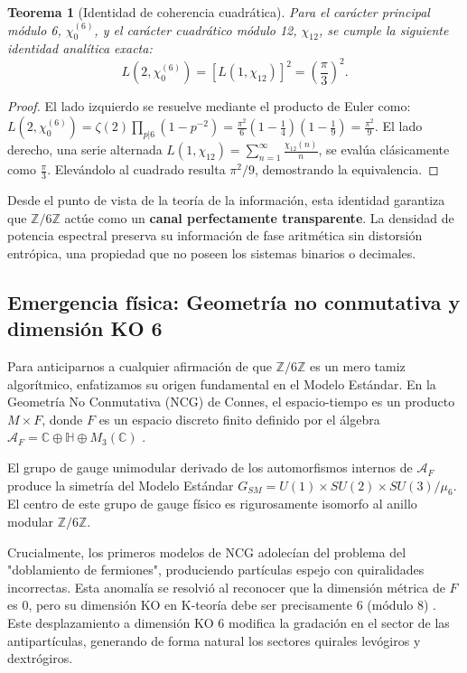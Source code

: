 \documentclass[aps,prl,preprint,superscriptaddress,floatfix]{revtex4-2}
\newtheorem{theorem}{Teorema}[section]
\newcommand{\Zmod}{\mathbb{Z}/6\mathbb{Z}}
\begin{document}
\begin{theorem}[Identidad de coherencia cuadrática]
\label{thm:quadratic}
Para el carácter principal módulo 6, $\chi_0^{(6)}$, y el carácter cuadrático módulo 12, $\chi_{12}$, se cumple la siguiente identidad analítica exacta:
\begin{equation}
L(2, \chi_0^{(6)}) = \left[ L(1, \chi_{12}) \right]^2 = \left( \frac{\pi}{3} \right)^2.
\end{equation}
\end{theorem}

\begin{proof}
El lado izquierdo se resuelve mediante el producto de Euler como:
$L(2, \chi_0^{(6)}) = \zeta(2) \prod_{p|6} (1-p^{-2}) = \frac{\pi^2}{6} \left(1-\frac{1}{4}\right)\left(1-\frac{1}{9}\right) = \frac{\pi^2}{9}$.
El lado derecho, una serie alternada $L(1, \chi_{12}) = \sum_{n=1}^\infty \frac{\chi_{12}(n)}{n}$, se evalúa clásicamente como $\frac{\pi}{3}$. Elevándolo al cuadrado resulta $\pi^2/9$, demostrando la equivalencia.
\end{proof}

Desde el punto de vista de la teoría de la información, esta identidad garantiza que $\Zmod$ actúe como un \textbf{canal perfectamente transparente}. La densidad de potencia espectral preserva su información de fase aritmética sin distorsión entrópica, una propiedad que no poseen los sistemas binarios o decimales.

\subsection{Emergencia física: Geometría no conmutativa y dimensión KO 6}

Para anticiparnos a cualquier afirmación de que $\Zmod$ es un mero tamiz algorítmico, enfatizamos su origen fundamental en el Modelo Estándar. En la Geometría No Conmutativa (NCG) de Connes, el espacio-tiempo es un producto $M \times F$, donde $F$ es un espacio discreto finito definido por el álgebra $\mathcal{A}_F = \mathbb{C} \oplus \mathbb{H} \oplus M_3(\mathbb{C})$ \cite{Connes2008}.

El grupo de gauge unimodular derivado de los automorfismos internos de $\mathcal{A}_F$ produce la simetría del Modelo Estándar $G_{SM} = U(1) \times SU(2) \times SU(3) / \mu_6$. El centro de este grupo de gauge físico es rigurosamente isomorfo al anillo modular $\mathbb{Z}/6\mathbb{Z}$. 

Crucialmente, los primeros modelos de NCG adolecían del problema del "doblamiento de fermiones", produciendo partículas espejo con quiralidades incorrectas. Esta anomalía se resolvió al reconocer que la dimensión métrica de $F$ es 0, pero su dimensión KO en K-teoría debe ser precisamente 6 (módulo 8) \cite{Chamseddine2007}. Este desplazamiento a dimensión KO 6 modifica la gradación en el sector de las antipartículas, generando de forma natural los sectores quirales levógiros y dextrógiros. 
\end{document}
